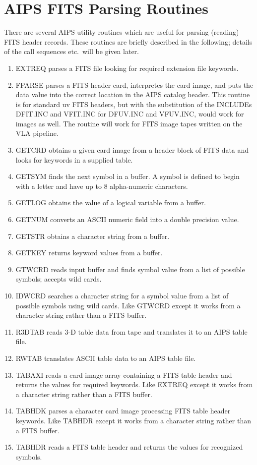\section{AIPS FITS Parsing Routines }
There are several AIPS utility routines which are useful for parsing
(reading) FITS header records.  These routines are briefly described
in the following; details of the call sequences etc.~will be given
later.
\begin{enumerate} %
\item EXTREQ parses a FITS file looking for required
extension file keywords.
\item FPARSE parses a FITS header card,
interpretes the card image, and puts the data value into the correct
location in the AIPS catalog header.  This routine is for standard uv
FITS headers, but with the substitution of the INCLUDEs DFIT.INC and
VFIT.INC for DFUV.INC and VFUV.INC, would work for images as well.
The routine will work for FITS image tapes written on the VLA
pipeline.
\item GETCRD obtains a given card image from a header
block of FITS data and looks for keywords in a supplied table.
\item GETSYM finds the next symbol in  a buffer. A symbol is
defined to begin with a letter and have up to 8 alpha-numeric
characters.
\item GETLOG obtains the value of a logical variable
from a buffer.
\item GETNUM converts an ASCII numeric field into a
double precision value.
\item GETSTR obtains a character string from a buffer.
\item GETKEY returns keyword values from a buffer.
\item GTWCRD reads input buffer and finds symbol value
from a list of possible symbols; accepts wild cards.
\item IDWCRD searches a character string for a symbol value
from a list of possible symbols using wild cards.  Like GTWCRD except
it works from a character string rather than a FITS buffer.
\item R3DTAB reads 3-D table data from tape and
translates it to an AIPS table file.
\item RWTAB translates ASCII table data to an AIPS table
file.
\item TABAXI reads a card image array containing a FITS
table header and returns the values for required keywords.  Like
EXTREQ except it works from a character string rather than a FITS
buffer.
\item TABHDK parses a character card image processing
FITS table header keywords.  Like TABHDR except it works from a
character string rather than a FITS buffer.
\item TABHDR reads a FITS table header and returns the
values for recognized symbols.
\end{enumerate} %

